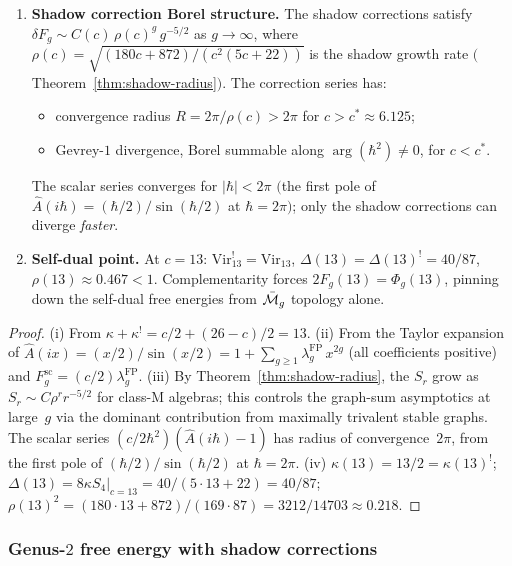 \begin{theorem}
\begin{enumerate}[label=\textup{(\roman*)}]
\item \textbf{Shadow correction Borel structure.}
The shadow corrections satisfy
$\delta F_g \sim C(c)\,\rho(c)^g\,g^{-5/2}$
as $g \to \infty$,
where $\rho(c) = \sqrt{(180c+872)/(c^2(5c+22))}$ is the
shadow growth rate
$($Theorem~\ref{thm:shadow-radius}$)$.
The correction series has:
\begin{itemize}
\item convergence radius
$R = 2\pi/\rho(c) > 2\pi$ for
$c > c^* \approx 6.125$;
\item Gevrey-$1$ divergence, Borel summable along
$\arg(\hbar^2) \neq 0$, for $c < c^*$.
\end{itemize}
The scalar series converges for $|\hbar| < 2\pi$
$($the first pole of $\hat{A}(i\hbar) = (\hbar/2)/\sin(\hbar/2)$ at $\hbar = 2\pi$$)$;
only the shadow corrections can diverge \emph{faster}.

\item \textbf{Self-dual point.}
At $c = 13$:
$\mathrm{Vir}_{13}^! = \mathrm{Vir}_{13}$,
$\Delta(13) = \Delta(13)^! = 40/87$,
$\rho(13) \approx 0.467 < 1$.
Complementarity forces
$2F_g(13) = \Phi_g(13)$,
pinning down the self-dual free energies from
$\bar{\mathcal{M}}_g$ topology alone.
\end{enumerate}
\end{theorem}

\begin{proof}
\textup{(i)} From $\kappa + \kappa^! = c/2 + (26-c)/2 = 13$.
\textup{(ii)} From the Taylor expansion of
$\hat{A}(ix) = (x/2)/\sin(x/2)
= 1 + \sum_{g \geq 1}\lambda_g^{\mathrm{FP}}\,x^{2g}$
(all coefficients positive) and
$F_g^{\mathrm{sc}} = (c/2)\lambda_g^{\mathrm{FP}}$.
\textup{(iii)} By
Theorem~\ref{thm:shadow-radius}, the $S_r$ grow as
$S_r \sim C\rho^r r^{-5/2}$ for class-M algebras;
this controls the graph-sum asymptotics at large~$g$
via the dominant contribution from maximally trivalent
stable graphs. The scalar series
$(c/2\hbar^2)(\hat{A}(i\hbar) - 1)$ has
radius of convergence~$2\pi$, from the first pole of
$(\hbar/2)/\sin(\hbar/2)$ at $\hbar = 2\pi$.
\textup{(iv)}
$\kappa(13) = 13/2 = \kappa(13)^!$;
$\Delta(13) = 8\kappa S_4|_{c=13}
= 40/(5\cdot 13+22) = 40/87$;
$\rho(13)^2 = (180\cdot 13+872)/(169\cdot 87)
= 3212/14703 \approx 0.218$.
\end{proof}

\subsubsection{Genus-$2$ free energy with shadow corrections}
\label{subsubsec:genus2-shadow-corrections}

